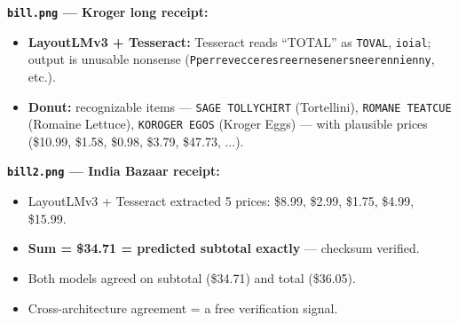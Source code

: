 \documentclass[landscape,a0paper,fontscale=0.285]{baposter}
\newcommand{\compresslist}{
\setlength{\itemsep}{1pt}
\setlength{\parskip}{0pt}
\setlength{\parsep}{0pt}
}
\begin{document}
\begin{poster}
{\begin{minipage}{0.5\textwidth}
\textbf{\texttt{bill.png} — Kroger long receipt:}
\begin{itemize}\compresslist
\item \textbf{LayoutLMv3 + Tesseract:} Tesseract reads ``TOTAL'' as
\texttt{TOVAL}, \texttt{ioial}; output is unusable nonsense
(\texttt{Pperrevecceresreernesenersneerennienny}, etc.).
\item \textbf{Donut:} recognizable items — \texttt{SAGE TOLLYCHIRT} (Tortellini),
\texttt{ROMANE TEATCUE} (Romaine Lettuce), \texttt{KOROGER EGOS} (Kroger Eggs) —
with plausible prices (\$10.99, \$1.58, \$0.98, \$3.79, \$47.73, ...).
\end{itemize}
\end{minipage}
\hfill
\begin{minipage}{0.45\textwidth}
\textbf{\texttt{bill2.png} — India Bazaar receipt:}
\begin{itemize}\compresslist
\item LayoutLMv3 + Tesseract extracted 5 prices: \$8.99, \$2.99, \$1.75, \$4.99, \$15.99.
\item \textbf{Sum = \$34.71 = predicted subtotal exactly} — checksum verified.
\item Both models agreed on subtotal (\$34.71) and total (\$36.05).
\item Cross-architecture agreement = a free verification signal.
\end{itemize}
\end{minipage}
}


\end{poster}
\end{document}
